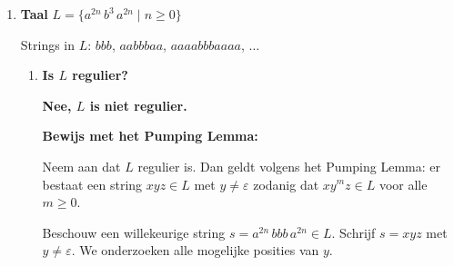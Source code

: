 \documentclass[11pt]{article}
\begin{document}
\begin{enumerate}
\begin{enumerate}
\textbf{Conditie:} Het Pumping Lemma stelt dat als $L$ een oneindige reguliere taal is, er dan een string $xyz \in L$ bestaat met $y \neq \varepsilon$ zodanig dat $xy^nz \in L$ voor alle $n \geq 0$.

\textbf{Voorbeeld:} Neem de string $0011 \in L$. Kies $x = \varepsilon$, $y = 00$, $z = 11$.

Dan geldt $xy^nz = (00)^n\,11$ voor alle $n \geq 0$:
\begin{itemize}
\item $n = 0$: $11$ --- 0 nullen (even), 2 enen (even) $\Rightarrow \in L$ \checkmark
\item $n = 1$: $0011$ --- 2 nullen (even), 2 enen (even) $\Rightarrow \in L$ \checkmark
\item $n = 2$: $000011$ --- 4 nullen (even), 2 enen (even) $\Rightarrow \in L$ \checkmark
\item Algemeen: $2n$ nullen (altijd even) gevolgd door 2 enen (even) $\Rightarrow \in L$ \checkmark
\end{itemize}

Aangezien er een decompositie $xyz$ bestaat met $y \neq \varepsilon$ zodanig dat $xy^nz \in L$ voor alle $n \geq 0$, voldoet de taal $L$ aan de pumping-conditie. Dit is consistent met het feit dat $L$ regulier is.

\end{enumerate}

\item \textbf{Taal} $L = \{a^{2n}\, b^3\, a^{2n} \mid n \geq 0\}$

Strings in $L$: $bbb$, $aabbbaa$, $aaaabbbaaaa$, $\ldots$

\begin{enumerate}
\item \textbf{Is $L$ regulier?}

\textbf{Nee, $L$ is niet regulier.}

\textbf{Bewijs met het Pumping Lemma:}

Neem aan dat $L$ regulier is. Dan geldt volgens het Pumping Lemma: er bestaat een string $xyz \in L$ met $y \neq \varepsilon$ zodanig dat $xy^mz \in L$ voor alle $m \geq 0$.

Beschouw een willekeurige string $s = a^{2n}\,bbb\,a^{2n} \in L$. Schrijf $s = xyz$ met $y \neq \varepsilon$. We onderzoeken alle mogelijke posities van $y$.


\end{enumerate}
\end{enumerate}
\end{document}
